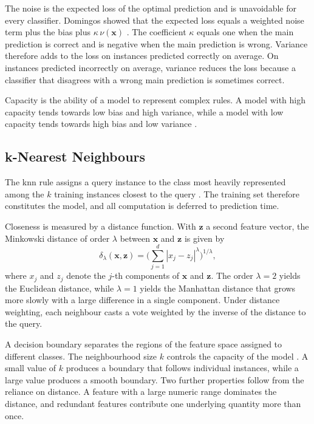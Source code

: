 \documentclass[conference]{IEEEtran}
\begin{document}
The noise is the expected loss of the optimal prediction and is unavoidable for
every classifier. Domingos showed that the expected loss equals a
weighted noise term plus the bias plus $\kappa\,\nu(\mathbf{x})$ \cite{domingos2000}. The coefficient
$\kappa$ equals one when the main prediction is correct and is negative when the
main prediction is wrong. Variance therefore adds to the loss on instances
predicted correctly on average. On instances predicted incorrectly on average,
variance reduces the loss because a classifier that disagrees with a wrong main
prediction is sometimes correct.

Capacity is the ability of a model to represent complex rules. A model with high
capacity tends towards low bias and high variance, while a model with low capacity
tends towards high bias and low variance \cite{hastie2009}.

\subsection{k-Nearest Neighbours}

The \gls{knn} rule assigns a query instance to the class most heavily represented
among the $k$ training instances closest to the query \cite{cover1967}. The
training set therefore constitutes the model, and all computation is deferred to
prediction time.

Closeness is measured by a distance function. With $\mathbf{z}$ a second feature
vector, the Minkowski distance of order $\lambda$ between $\mathbf{x}$ and
$\mathbf{z}$ is given by
\begin{equation}
\delta_\lambda(\mathbf{x}, \mathbf{z}) = \Big( \sum_{j=1}^{d} |x_j - z_j|^\lambda \Big)^{1/\lambda},
\end{equation}
where $x_j$ and $z_j$ denote the $j$-th components of $\mathbf{x}$ and
$\mathbf{z}$. The order $\lambda = 2$ yields the Euclidean distance, while
$\lambda = 1$ yields the Manhattan distance that grows more slowly with a large
difference in a single component. Under distance weighting, each neighbour casts
a vote weighted by the inverse of the distance to the query.

A decision boundary separates the regions of the feature space assigned to
different classes. The neighbourhood size $k$ controls the capacity of the model \cite{hastie2009}.
A small value of $k$ produces a boundary that follows individual instances, while
a large value produces a smooth boundary. Two further properties follow from the
reliance on distance. A feature with a large numeric range dominates the
distance, and redundant features contribute one underlying quantity more than
once.
\end{document}
